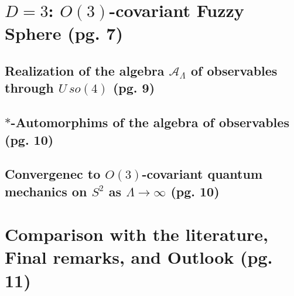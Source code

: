 \documentclass{article}
\begin{document}
\section{$D = 3$: $O(3)$-covariant Fuzzy Sphere (pg. 7)}

\subsection{Realization of the algebra $\mathcal A_\Lambda$ of observables through $U\,so(4)$ (pg. 9)}

\subsection{$*$-Automorphims of the algebra of observables (pg. 10)}


\subsection{Convergenec to $O(3)$-covariant quantum mechanics on $S^2$ as $\Lambda \to \infty$ (pg. 10)}


\section{Comparison with the literature, Final remarks, and Outlook (pg. 11)}
\end{document}
